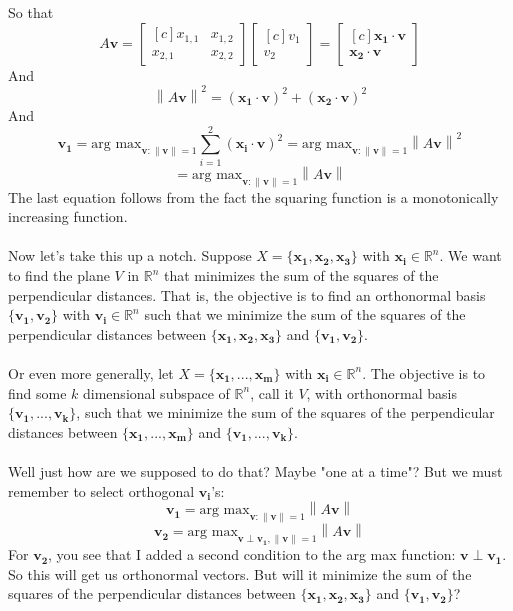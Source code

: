 \documentclass{tufte-handout}
\newcommand{\norm}[1]{\left\lVert#1\right\rVert}
\begin{document}
So that
\[
A\mathbf{v}=
\begin{bmatrix*}[c]
x_{1,1}&x_{1,2}\\
x_{2,1}&x_{2,2}
\end{bmatrix*}
\begin{bmatrix*}[c]
v_1\\v_2
\end{bmatrix*}
=
\begin{bmatrix*}[c]
\mathbf{x_1}\cdot\mathbf{v}\\\mathbf{x_2}\cdot\mathbf{v}
\end{bmatrix*}
\]
And
\[
\norm{A\mathbf{v}}^2=
(\mathbf{x_1}\cdot\mathbf{v})^2
+(\mathbf{x_2}\cdot\mathbf{v})^2
\]
And
\[
\mathbf{v_1}=\text{arg max}
_{\mathbf{v}:\norm{\mathbf{v}}=1}\sum_{i=1}^{2}(\mathbf{x_i}\cdot\mathbf{v})^2
=
\text{arg max}_{\mathbf{v}:\norm{\mathbf{v}}=1}\norm{A\mathbf{v}}^2
\]
\[
=
\text{arg max}_{\mathbf{v}:\norm{\mathbf{v}}=1}\norm{A\mathbf{v}}
\]
The last equation follows from the fact the squaring function is a monotonically increasing function.\\\leavevmode\\

\noindent Now let's take this up a notch. Suppose $X=\{\mathbf{x_1},\mathbf{x_2}, \mathbf{x_3}\}$ with $\mathbf{x_i}\in\mathbb{R}^n$. We want to find the plane $V$ in $\mathbb{R}^n$ that minimizes the sum of the squares of the perpendicular distances. That is, the objective is to find an orthonormal basis $\{\mathbf{v_1},\mathbf{v_2}\}$ with $\mathbf{v_i}\in\mathbb{R}^n$ such that we minimize the sum of the squares of the perpendicular distances between $\{\mathbf{x_1},\mathbf{x_2}, \mathbf{x_3}\}$ and $\{\mathbf{v_1}, \mathbf{v_2}\}$.\\\leavevmode\\


\noindent Or even more generally, let $X=\{\mathbf{x_1},...,\mathbf{x_m}\}$ with $\mathbf{x_i}\in\mathbb{R}^n$. The objective is to find some $k$ dimensional subspace of $\mathbb{R}^n$, call it $V$, with orthonormal basis $\{\mathbf{v_1},...,\mathbf{v_k}\}$, such that we minimize the sum of the squares of the perpendicular distances between $\{\mathbf{x_1},...,\mathbf{x_m}\}$ and $\{\mathbf{v_1},...,\mathbf{v_k}\}$.\\\leavevmode\\

\noindent Well just how are we supposed to do that? Maybe "one at a time"? But we must remember to select orthogonal $\mathbf{v_i}$'s:
\[
\mathbf{v_1}
=
\text{arg max}_{\mathbf{v}:\norm{\mathbf{v}}=1}\norm{A\mathbf{v}}
\]
\[
\mathbf{v_2}
=
\text{arg max}_{\mathbf{v}\perp\mathbf{v_1},\norm{\mathbf{v}}=1}\norm{A\mathbf{v}}
\]
For $\mathbf{v_2}$, you see that I added a second condition to the arg max function: $\mathbf{v}\perp\mathbf{v_1}$. So this will get us orthonormal vectors. But will it minimize the sum of the squares of the perpendicular distances between $\{\mathbf{x_1},\mathbf{x_2}, \mathbf{x_3}\}$ and $\{\mathbf{v_1}, \mathbf{v_2}\}$?\\\leavevmode\\
\end{document}
